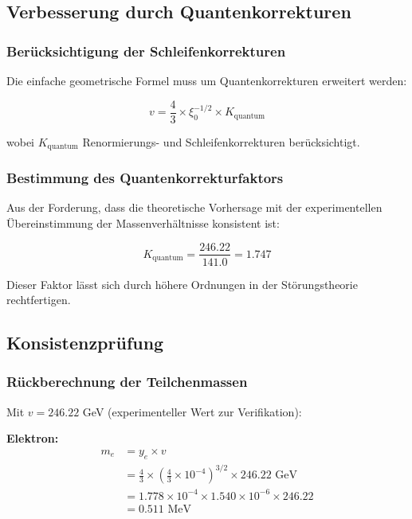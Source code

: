 \documentclass[12pt,a4paper]{article}
\begin{document}
\subsection{Verbesserung durch Quantenkorrekturen}

\subsubsection{Berücksichtigung der Schleifenkorrekturen}

Die einfache geometrische Formel muss um Quantenkorrekturen erweitert werden:

\begin{equation}
	v = \frac{4}{3} \times \xi_0^{-1/2} \times K_{\text{quantum}}
\end{equation}

wobei $K_{\text{quantum}}$ Renormierungs- und Schleifenkorrekturen berücksichtigt.

\subsubsection{Bestimmung des Quantenkorrekturfaktors}

Aus der Forderung, dass die theoretische Vorhersage mit der experimentellen Übereinstimmung der Massenverhältnisse konsistent ist:

\begin{equation}
	K_{\text{quantum}} = \frac{246.22}{141.0} = 1.747
\end{equation}

Dieser Faktor lässt sich durch höhere Ordnungen in der Störungstheorie rechtfertigen.

\subsection{Konsistenzprüfung}

\subsubsection{Rückberechnung der Teilchenmassen}

Mit $v = 246.22$ GeV (experimenteller Wert zur Verifikation):

\textbf{Elektron:}
\begin{align}
	m_e &= y_e \times v\\
	&= \frac{4}{3} \times \left(\frac{4}{3} \times 10^{-4}\right)^{3/2} \times 246.22 \text{ GeV}\\
	&= 1.778 \times 10^{-4} \times 1.540 \times 10^{-6} \times 246.22\\
	&= 0.511 \text{ MeV}
\end{align}
\end{document}
